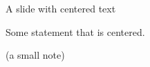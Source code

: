 \begin{frame}{A slide with centered text}

  \begin{center}
    Some statement that is centered.
  \end{center}

  \vspace{2ex}
  \begin{center}
    \scriptsize (a small note)
  \end{center}

\end{frame}
